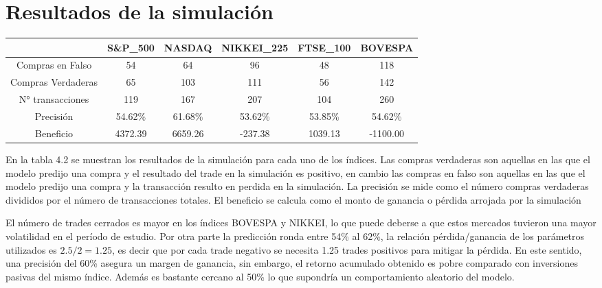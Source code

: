 \documentclass[a4paper,12pt]{Latex/Classes/PhDthesisPSnPDF}
\begin{document}
\section{Resultados de la simulación}


\begin{center}
\begin{table}[ht]
\centering
\begin{tabular}{cccccc}
  \hline
 & S\&P\_500 & NASDAQ & NIKKEI\_225 & FTSE\_100 & BOVESPA \\ 
  \hline
Compras en Falso & 54 & 64 & 96 & 48 & 118 \\ 
  Compras Verdaderas & 65 & 103 & 111 & 56 & 142 \\ 
  N° transacciones & 119 & 167 & 207 & 104 & 260 \\ 
  Precisión & 54.62\% & 61.68\% & 53.62\% & 53.85\% & 54.62\% \\ 
  Beneficio & 4372.39 & 6659.26 & -237.38 & 1039.13 & -1100.00 \\ 
   \hline
\end{tabular}
\end{table}\end{center}

En la tabla 4.2 se muestran los resultados de la simulación para cada uno de los índices. Las compras verdaderas son aquellas en las que el modelo predijo una compra y el resultado del trade en la simulación es positivo, en cambio las compras en falso son aquellas en las que el modelo predijo una compra y la transacción resulto en perdida en la simulación. La precisión se mide como el número compras verdaderas divididos por el número de transacciones totales. El beneficio se calcula como el monto de ganancia o pérdida arrojada por la simulación

El número de trades cerrados es mayor en los índices BOVESPA y NIKKEI, lo que puede deberse a que estos mercados tuvieron una mayor volatilidad en el período de estudio. Por otra parte la predicción ronda entre 54\% al 62\%, la relación pérdida/ganancia de los parámetros utilizados es $2.5/2 = 1.25$, es decir que por cada trade negativo se necesita 1.25 trades positivos para mitigar la pérdida. En este sentido, una precisión del 60\% asegura un margen de ganancia, sin embargo, el retorno acumulado obtenido es pobre comparado con inversiones pasivas del mismo índice. Además es bastante cercano al 50\% lo que supondría un comportamiento aleatorio del modelo.
 
\end{document}
